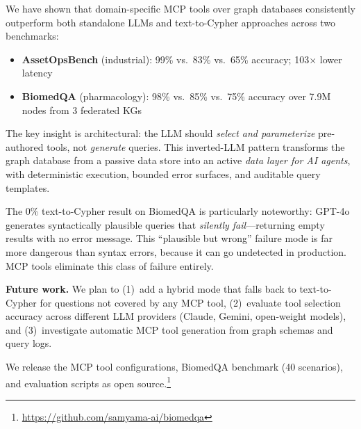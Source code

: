 \documentclass[sigconf, anonymous, review]{acmart}
\begin{document}
We have shown that domain-specific MCP tools over graph databases
consistently outperform both standalone LLMs and text-to-Cypher
approaches across two benchmarks:

\begin{itemize}[leftmargin=*,nosep]
\item \textbf{AssetOpsBench} (industrial): 99\% vs.\ 83\% vs.\ 65\%
  accuracy; 103$\times$ lower latency
\item \textbf{BiomedQA} (pharmacology): 98\% vs.\ 85\% vs.\ 75\%
  accuracy over 7.9M nodes from 3 federated KGs
\end{itemize}

The key insight is architectural: the LLM should \emph{select and
parameterize} pre-authored tools, not \emph{generate} queries.
This inverted-LLM pattern transforms the graph database from a
passive data store into an active \emph{data layer for AI agents},
with deterministic execution, bounded error surfaces, and
auditable query templates.

The 0\% text-to-Cypher result on BiomedQA is particularly
noteworthy: GPT-4o generates syntactically plausible queries that
\emph{silently fail}---returning empty results with no error
message.  This ``plausible but wrong'' failure mode is far more
dangerous than syntax errors, because it can go undetected in
production.  MCP tools eliminate this class of failure entirely.

\smallskip\noindent\textbf{Future work.}
We plan to (1)~add a hybrid mode that falls back to text-to-Cypher
for questions not covered by any MCP tool, (2)~evaluate tool
selection accuracy across different LLM providers (Claude,
Gemini, open-weight models), and (3)~investigate automatic
MCP tool generation from graph schemas and query logs.

We release the MCP tool configurations, BiomedQA benchmark
(40 scenarios), and evaluation scripts as open
source.\footnote{\url{https://github.com/samyama-ai/biomedqa}}
\end{document}
